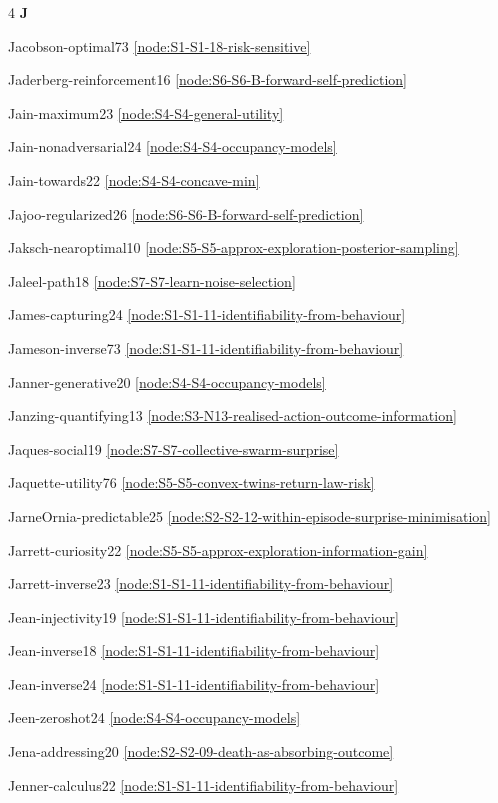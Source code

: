 \documentclass[10pt]{article}
\begin{document}
{\begin{multicols}{4}
\smallskip\textbf{J}\par
Jacobson-optimal73 \hfill \ref{node:S1-S1-18-risk-sensitive}\par
Jaderberg-reinforcement16 \hfill \ref{node:S6-S6-B-forward-self-prediction}\par
Jain-maximum23 \hfill \ref{node:S4-S4-general-utility}\par
Jain-nonadversarial24 \hfill \ref{node:S4-S4-occupancy-models}\par
Jain-towards22 \hfill \ref{node:S4-S4-concave-min}\par
Jajoo-regularized26 \hfill \ref{node:S6-S6-B-forward-self-prediction}\par
Jaksch-nearoptimal10 \hfill \ref{node:S5-S5-approx-exploration-posterior-sampling}\par
Jaleel-path18 \hfill \ref{node:S7-S7-learn-noise-selection}\par
James-capturing24 \hfill \ref{node:S1-S1-11-identifiability-from-behaviour}\par
Jameson-inverse73 \hfill \ref{node:S1-S1-11-identifiability-from-behaviour}\par
Janner-generative20 \hfill \ref{node:S4-S4-occupancy-models}\par
Janzing-quantifying13 \hfill \ref{node:S3-N13-realised-action-outcome-information}\par
Jaques-social19 \hfill \ref{node:S7-S7-collective-swarm-surprise}\par
Jaquette-utility76 \hfill \ref{node:S5-S5-convex-twins-return-law-risk}\par
JarneOrnia-predictable25 \hfill \ref{node:S2-S2-12-within-episode-surprise-minimisation}\par
Jarrett-curiosity22 \hfill \ref{node:S5-S5-approx-exploration-information-gain}\par
Jarrett-inverse23 \hfill \ref{node:S1-S1-11-identifiability-from-behaviour}\par
Jean-injectivity19 \hfill \ref{node:S1-S1-11-identifiability-from-behaviour}\par
Jean-inverse18 \hfill \ref{node:S1-S1-11-identifiability-from-behaviour}\par
Jean-inverse24 \hfill \ref{node:S1-S1-11-identifiability-from-behaviour}\par
Jeen-zeroshot24 \hfill \ref{node:S4-S4-occupancy-models}\par
Jena-addressing20 \hfill \ref{node:S2-S2-09-death-as-absorbing-outcome}\par
Jenner-calculus22 \hfill \ref{node:S1-S1-11-identifiability-from-behaviour}\par

\end{multicols}}
\end{document}
